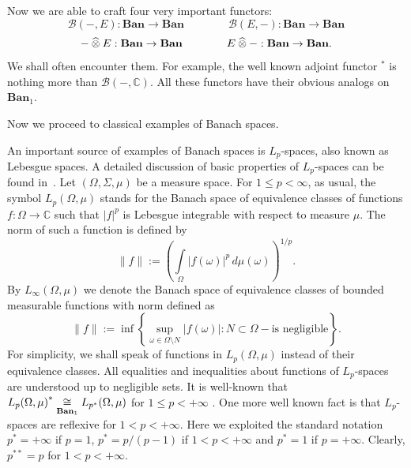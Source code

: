 Now we are able to craft four very important functors:
\[
\mathcal{B}(-,E):\mathbf{Ban}\to\mathbf{Ban}
\qquad\qquad
\mathcal{B}(E,-):\mathbf{Ban}\to\mathbf{Ban}
\]
\[
-\mathbin{\widehat{\otimes}} E:\mathbf{Ban}\to\mathbf{Ban}
\qquad\qquad
E\mathbin{\widehat{\otimes}} -:\mathbf{Ban}\to\mathbf{Ban}.
\]
We shall often encounter them. For example, the well known adjoint functor
${}^*$ is nothing more than $\mathcal{B}(-,\mathbb{C})$. All these functors have
their obvious analogs on $\mathbf{Ban}_1$.

Now we  proceed to classical examples of Banach spaces. 

An important source of examples of Banach spaces is $L_p$-spaces, also known as
Lebesgue spaces. A detailed discussion of basic properties of $L_p$-spaces can
be found in~\cite{CarothShortCourseBanSp}.  Let $(\Omega,\Sigma,\mu)$ be a
measure space.  For $1\leq p<\infty$, as usual, the symbol $L_p(\Omega,\mu)$
stands for the Banach space of equivalence classes of functions
$f:\Omega\to\mathbb{C}$ such that $|f|^p$ is Lebesgue integrable with respect to
measure $\mu$. The norm of such a function is defined by
\[
\lVert f\rVert
:={\left(
  \int\limits_{\Omega}{|f(\omega)|}^p\,d\mu(\omega)
\right)}^{1/p}.
\] 
By $L_\infty(\Omega,\mu)$ we denote the Banach space of equivalence classes of
bounded measurable functions with norm defined as 
\[
\lVert f\rVert:=\inf\left \{
  \sup_{\omega\in\Omega\setminus N}|f(\omega)|
  :N\subset\Omega - \mbox{is negligible}
\right \}.
\]
For simplicity, we shall speak of functions in $L_p(\Omega,\mu)$ instead of their
equivalence classes. All equalities and inequalities about functions of
$L_p$-spaces are understood up to negligible sets. It is well-known that
${L_p(\Omega,\mu)}^*\mathrel{\mathop{\cong}\limits_{\mathbf{Ban}_1}}L_{p^*}(\Omega,\mu)$ for 
$1\leq p<+\infty$ \cite[theorems 243G, 244K]{FremMeasTh}. 
One more well known fact is that $L_p$-spaces are reflexive for 
$1<p<+\infty$. Here we exploited the standard 
notation $p^*=+\infty$ if $p=1$, $p^*=p/(p-1)$ if $1<p<+\infty$ and $p^*=1$ if $p=+\infty$.
Clearly, $p^{**}=p$ for $1<p<+\infty$.

